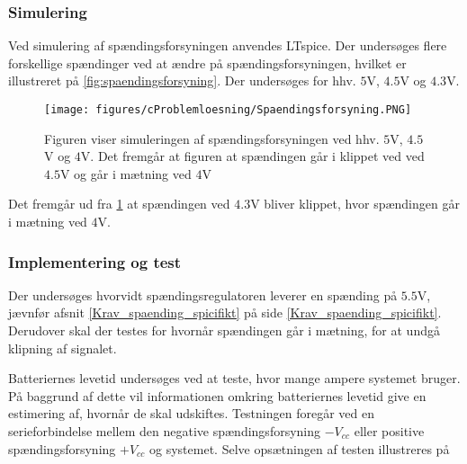 \subsubsection{Simulering}
Ved simulering af spændingsforsyningen anvendes LTspice. Der undersøges flere forskellige spændinger ved at ændre på spændingsforsyningen, hvilket er illustreret på \ref{fig:spaendingsforsyning}. Der undersøges for hhv. $5$V, $4.5$V og $4.3$V.
\begin{figure}[H]
	\centering
	\texttt{[image: figures/cProblemloesning/Spaendingsforsyning.PNG]}
	\caption{Figuren viser simuleringen af spændingsforsyningen ved hhv. $5$V, $4.5$V og $4$V. Det fremgår at figuren at spændingen går i klippet ved ved $4.5$V og går i mætning ved $4$V}
	\label{fig:spaendingsforsyning_graf}
\end{figure}
Det fremgår ud fra \ref{fig:spaendingsforsyning_graf} at spændingen ved $4.3$V bliver klippet, hvor spændingen går i mætning ved $4$V. 

\subsubsection{Implementering og test}
Der undersøges hvorvidt spændingsregulatoren leverer en spænding på $5.5$V, jævnfør afsnit \ref{Krav_spaending_spicifikt} på side \ref{Krav_spaending_spicifikt}. Derudover skal der testes for hvornår spændingen går i mætning, for at undgå klipning af signalet.


Batteriernes levetid undersøges ved at teste, hvor mange ampere systemet bruger. På baggrund af dette vil informationen omkring batteriernes levetid give en estimering af, hvornår de skal udskiftes. Testningen foregår ved en serieforbindelse mellem den negative spændingsforsyning $-V_{cc}$ eller positive spændingsforsyning $+V_{cc}$ og systemet. Selve opsætningen af testen illustreres på %


